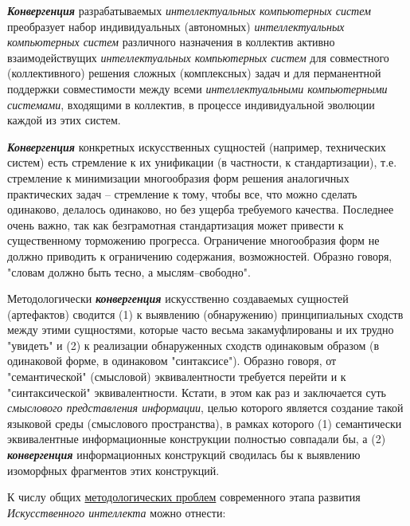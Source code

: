 \textbf{\textit{Конвергенция}} разрабатываемых \textit{интеллектуальных компьютерных систем} преобразует набор индивидуальных (автономных) \textit{интеллектуальных компьютерных систем} различного назначения в коллектив активно взаимодействущих \textit{интеллектуальных компьютерных систем} для совместного (коллективного) решения сложных (комплексных) задач и для перманентной поддержки совместимости между всеми \textit{интеллектуальными компьютерными системами}, входящими в коллектив, в процессе индивидуальной эволюции каждой из этих систем.

\textbf{\textit{Конвергенция}} конкретных искусственных сущностей (например, технических систем) есть стремление к их унификации (в частности, к стандартизации), т.е. стремление к минимизации многообразия форм решения аналогичных практических задач -- стремление к тому, чтобы все, что можно сделать одинаково, делалось одинаково, но без ущерба требуемого качества. Последнее очень важно, так как безграмотная стандартизация может привести к существенному торможению прогресса. Ограничение многообразия форм не должно приводить к ограничению содержания, возможностей. Образно говоря, "словам должно быть тесно, а мыслям--свободно"{}.

Методологически \textbf{\textit{конвергенция}} искусственно создаваемых сущностей (артефактов) сводится (1) к выявлению (обнаружению) принципиальных сходств между этими сущностями, которые часто весьма закамуфлированы и их трудно "увидеть"{} и (2) к реализации обнаруженных сходств одинаковым образом (в одинаковой форме, в одинаковом "синтаксисе"{}). Образно говоря, от "семантической"{} (смысловой) эквивалентности требуется перейти и к "синтаксической"{} эквивалентности. Кстати, в этом как раз и заключается суть \textit{смыслового представления информации}, целью которого является создание такой языковой среды (смыслового пространства), в рамках которого (1) семантически эквивалентные информационные конструкции полностью совпадали бы, а (2) \textbf{\textit{конвергенция}} информационных конструкций сводилась бы к выявлению изоморфных фрагментов этих конструкций.

К числу общих \underline{методологических проблем} современного этапа развития \textit{Искусственного интеллекта} можно отнести:

